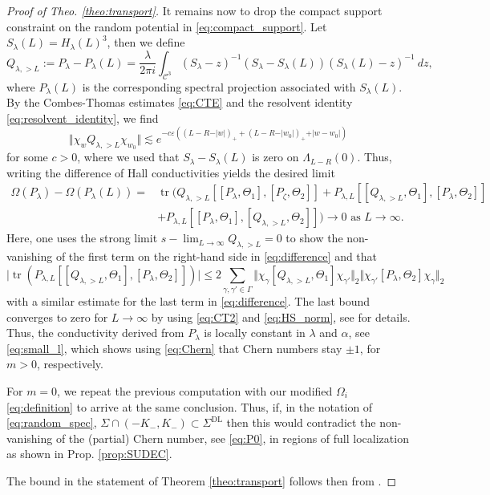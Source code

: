 \documentclass[reqno,12pt,letterpaper]{amsart}
\numberwithin{equation}{section}
\DeclareMathOperator{\tr}{tr}
\begin{document}
\begin{proof}[Proof of Theo. \ref{theo:transport}]
It remains now to drop the compact support constraint on the random potential in \eqref{eq:compact_support}.
Let $S_{\lambda}(L)=H_{\lambda}(L)^3$, then we define
\begin{equation}
\label{eq:resolvent_identity}
Q_{\lambda,>L}:=P_{\lambda}-P_{\lambda}(L) = \frac{\lambda}{2\pi i} \int_{\mathcal C^3} (S_{\lambda}-z)^{-1}(S_{\lambda}-S_{\lambda}(L))(S_{\lambda}(L)-z)^{-1} \ dz,
\end{equation}
where $P_{\lambda}(L)$ is the corresponding spectral projection associated with $S_{\lambda}(L).$
By the Combes-Thomas estimates \eqref{eq:CTE} and the resolvent identity \eqref{eq:resolvent_identity}, we find 
\[\Vert \chi_w Q_{\lambda,>L} \chi_{w_0} \Vert \lesssim e^{-c\varepsilon ((L-R-\vert w \vert)_+ + (L-R-\vert w_0 \vert)_+ + \vert w-w_0 \vert)}\]
for some $c>0$, where we used that $S_{\lambda}-S_{\lambda}(L)$ is zero on $\Lambda_{L-R}(0).$
Thus, writing the difference of Hall conductivities yields the desired limit
\begin{equation}
\label{eq:difference}
\begin{split} \Omega(P_{\lambda})-\Omega(P_{\lambda}(L)) =& \tr(Q_{\lambda,>L}[[P_{\lambda}, \Theta_1], [P_{\zeta}, \Theta_2]]+P_{\lambda,L}[ [Q_{\lambda,>L}, \Theta_1], [P_{\lambda}, \Theta_2] ] \\
&+P_{\lambda, L}[[ P_{\lambda},\Theta_1],[Q_{\lambda,>L} ,\Theta_2] ])\to 0 \text{ as } L \to \infty.\end{split}
\end{equation}
Here, one uses the strong limit $s-\lim_{L \to \infty}Q_{\lambda,>L}=0$ to show the non-vanishing of the first term on the right-hand side in \eqref{eq:difference} and that 
\[\vert \tr(P_{\lambda,L}[ [Q_{\lambda,>L}, \Theta_1], [P_{\lambda}, \Theta_2] ])\vert \le 2\sum_{\gamma,\gamma' \in \Gamma} \Vert \chi_{\gamma}  [Q_{\lambda,>L}, \Theta_1] \chi_{\gamma'} \Vert_2 \Vert \chi_{\gamma'} [P_{\lambda}, \Theta_2] \chi_{\gamma}\Vert_2 \]
with a similar estimate for the last term in \eqref{eq:difference}. The last bound converges to zero for $L \to \infty$ by using \eqref{eq:CT2} and \eqref{eq:HS_norm}, see \cite[Lemma 3.1 (i)]{GKS} for details. 
Thus, the conductivity derived from $P_{\lambda}$ is locally constant in $\lambda$ and $\alpha$, see \eqref{eq:small_l}, which shows using \eqref{eq:Chern} that Chern numbers stay $\pm 1$, for $m >0$, respectively. 


For $m=0$, we repeat the previous computation with our modified $\Omega_i$  \eqref{eq:definition} to arrive at the same conclusion. Thus, if, in the notation of \eqref{eq:random_spec}, $\Sigma \cap (-K_-,K_-) \subset \Sigma^{\operatorname{DL}}$ then this would contradict the non-vanishing of the (partial) Chern number, see \eqref{eq:P0}, in regions of full localization as shown in Prop. \ref{prop:SUDEC}.


The bound in the statement of Theorem \ref{theo:transport} follows then from \cite[Theo $2.10$]{GK04}.

\end{proof}
\end{document}
